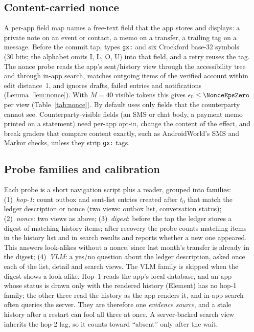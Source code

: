 \subsection{Content-carried nonce}
\label{sec:design-nonce}
A per-app field map names a free-text field that the app stores and displays: a private note on an event or contact, a memo on a transfer, a trailing tag on a message.
Before the commit tap, \sys types \texttt{gx:} and six Crockford base-32 symbols (30 bits; the alphabet omits I, L, O, U) into that field, and a retry reuses the tag.
The nonce probe reads the app's sent/history view through the accessibility tree and through in-app search, matches outgoing items of the verified account within edit distance~1,
and ignores drafts, failed entries and notifications (Lemma~\ref{lem:nonce}). With $M{=}40$ visible tokens this gives $\epsilon_0\le\NonceEpsZero$ per view (Table~\ref{tab:nonce}).
By default \sys uses only fields that the counterparty cannot see. Counterparty-visible fields (an SMS or chat body, a payment memo printed on a statement) need per-app opt-in, change
the content of the effect, and break graders that compare content exactly, such as AndroidWorld's SMS and Markor checks, unless they strip \texttt{gx:} tags.

\subsection{Probe families and calibration}
\label{sec:design-probes}
Each probe is a short navigation script plus a reader, grouped into families:
(1)~\emph{hop-1}: count outbox and sent-list entries created after $t_0$ that match the ledger description or nonce (two views: outbox list, conversation status);
(2)~\emph{nonce}: two views as above;
(3)~\emph{digest}: before the tap the ledger stores a digest of matching history items; after recovery the probe counts matching items in the history list and in search results
and reports whether a new one appeared. This answers look-alikes without a nonce, since last month's transfer is already in the digest;
(4)~\emph{VLM}: a yes/no question about the ledger description, asked once each of the list, detail and search views. The VLM family is skipped when the digest shows a look-alike.
Hop~1 reads the app's local database, and an app whose status is drawn only with the rendered history (Element) has no hop-1 family; the other three read the history as
the app renders it, and in-app search often queries the server. They are therefore one
\emph{evidence source}, and a stale history after a restart can fool all three at once. A server-backed search view inherits the hop-2 lag, so it counts toward ``absent'' only after the wait.


